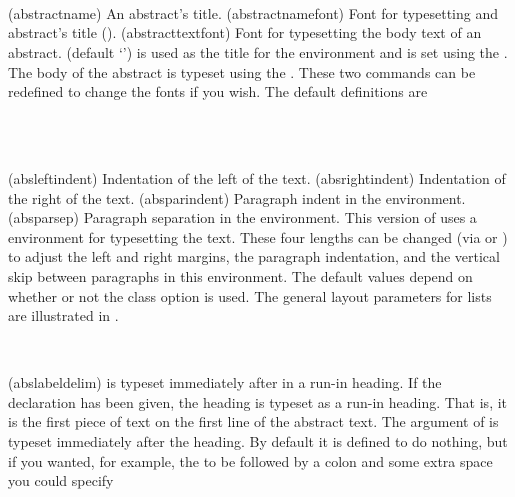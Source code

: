 \begin{syntax}
\cmd{\abstractname} \\
\cmd{\abstractnamefont} \\
\cmd{\abstracttextfont} \\
\end{syntax}
\glossary(abstractname)%
  {}%
  {An abstract's title.}
\glossary(abstractnamefont)%
  {}%
  {Font for typesetting and abstract's title ().}
\glossary(abstracttextfont)%
  {}%
  {Font for typesetting the body text of an abstract.}
\cmd{\abstractname} (default `\abstractname') is used as the title for
the  environment and is set using the \cmd{\abstractnamefont}.
The body of the abstract is typeset using the \cmd{\abstracttextfont}.
These two commands can be redefined to change the fonts if you wish.
The default definitions are 
\begin{lcode}
\newcommand{\abstractnamefont}{\normalfont\small\bfseries}
\newcommand{\abstracttextfont}{\normalfont\small}
\end{lcode}

\begin{syntax}
\lnc{\absleftindent} \lnc{\absrightindent} \\
\lnc{\absparindent} \lnc{\absparsep} \\
\end{syntax}
\glossary(absleftindent)%
  {}%
  {Indentation of the left of the  text.}
\glossary(absrightindent)%
  {}%
  {Indentation of the right of the  text.}
\glossary(absparindent)%
  {}%
  {Paragraph indent in the  environment.}
\glossary(absparsep)%
  {}%
  {Paragraph separation in the  environment.}
   This version of  uses a  environment for typesetting
the text. These four lengths can be changed (via \cmd{\setlength}
 or \cmd{\addtolength}) to adjust
the left and right margins, the paragraph indentation, and the vertical skip
between paragraphs in this environment. 
The default values depend on whether or not the 
class option is used. The general layout parameters for lists are illustrated
in .

\begin{syntax}
\cmd{\abslabeldelim} \\
\end{syntax}
\glossary(abslabeldelim)%
  {}%
  { is typeset immediately after  in a run-in
   heading.}
If the \cmd{\abstractrunin} declaration has been given, 
the heading is typeset as a run-in heading. That is, it is the 
first piece of text on the first line of the abstract text.
The  argument of \cmd{\abslabeldelim} is typeset
immediately after the heading. By default it is defined to do nothing, but
if you wanted, for example, the \cmd{\abstractname} to be followed by 
a colon and some extra space you could specify
\begin{lcode}
\abslabeldelim{:\quad}
\end{lcode}

